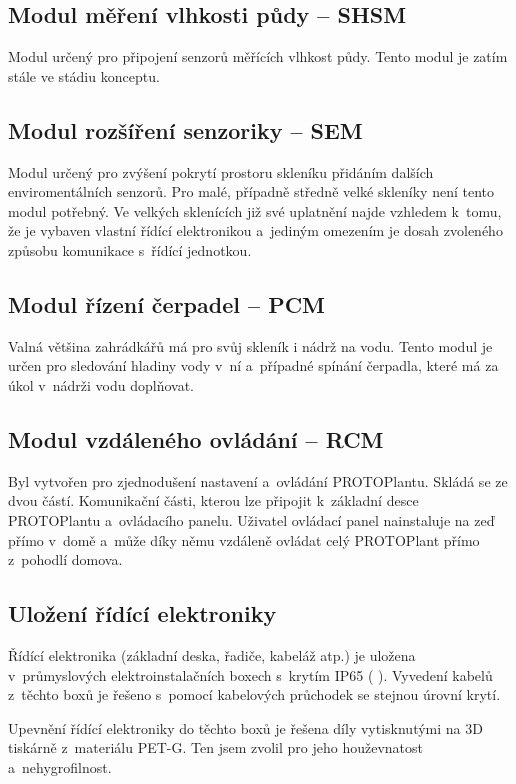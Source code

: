 \subsection{Modul měření vlhkosti půdy -- SHSM}
\label{subsec:SHSM}
Modul určený pro připojení senzorů měřících vlhkost půdy.
Tento modul je zatím stále ve stádiu konceptu.

\subsection{Modul rozšíření senzoriky -- SEM}
\label{subsec:SEM}
Modul určený pro zvýšení pokrytí prostoru skleníku přidáním dalších enviromentálních senzorů.
Pro malé, případně středně velké skleníky není tento modul potřebný. 
Ve velkých sklenících již své uplatnění najde vzhledem k~tomu, že je vybaven vlastní řídící elektronikou a~jediným omezením je dosah zvoleného způsobu komunikace s~řídící jednotkou.

\subsection{Modul řízení čerpadel -- PCM}
\label{subsec:PCM}
Valná většina zahrádkářů má pro svůj skleník i nádrž na vodu.
Tento modul je určen pro sledování hladiny vody v~ní a~případné spínání čerpadla, které má za úkol v~nádrži vodu doplňovat.

\subsection{Modul vzdáleného ovládání -- RCM}
\label{subsec:RCM}
Byl vytvořen pro zjednodušení nastavení a~ovládání PROTOPlantu.
Skládá se ze dvou částí. 
Komunikační části, kterou lze připojit k~základní desce PROTOPlantu a~ovládacího panelu. 
Uživatel ovládací panel nainstaluje na zeď přímo v~domě a~může díky němu vzdáleně ovládat celý PROTOPlant přímo z~pohodlí domova. 

\subsection{Uložení řídící elektroniky}
Řídící elektronika (základní deska, řadiče, kabeláž atp.) je uložena v~průmyslových elektroinstalačních boxech s~krytím IP65 ( \cite{IP_ratings}).
Vyvedení kabelů z~těchto boxů je řešeno s~pomocí kabelových průchodek se stejnou úrovní krytí.

Upevnění řídící elektroniky do těchto boxů je řešena díly vytisknutými na 3D tiskárně z~materiálu PET-G.
Ten jsem zvolil pro jeho houževnatost a~nehygrofilnost.

